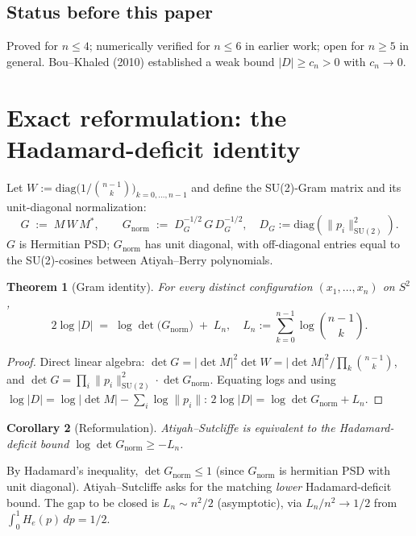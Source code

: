\documentclass[11pt,a4paper]{article}
\newtheorem{theorem}{Theorem}[section]
\newtheorem{corollary}[theorem]{Corollary}
\begin{document}
\subsection{Status before this paper}
Proved for $n \le 4$; numerically verified for $n \le 6$ in earlier work; open
for $n \ge 5$ in general. Bou--Khaled (2010) established a weak bound
$|D| \ge c_n > 0$ with $c_n \to 0$.

\section{Exact reformulation: the Hadamard-deficit identity}\label{sec:reformulation}

Let $W := \mathrm{diag}\bigl(1/\binom{n-1}{k}\bigr)_{k=0,\ldots,n-1}$ and define the
SU(2)-Gram matrix and its unit-diagonal normalization:
\[
G \;:=\; M\, W\, M^*, \qquad
G_{\mathrm{norm}} \;:=\; D_{\!G}^{-1/2}\, G\, D_{\!G}^{-1/2},
\quad D_{\!G} := \mathrm{diag}(\|p_i\|_{\mathrm{SU}(2)}^2).
\]
$G$ is Hermitian PSD; $G_{\mathrm{norm}}$ has unit diagonal, with off-diagonal
entries equal to the SU(2)-cosines between Atiyah--Berry polynomials.

\begin{theorem}[Gram identity]\label{thm:identity}
For every distinct configuration $(x_1, \ldots, x_n)$ on $S^2$,
\[
\boxed{
2 \log |D| \;=\; \log \det\bigl(G_{\mathrm{norm}}\bigr) \;+\; L_n,
\quad L_n := \sum_{k=0}^{n-1} \log \binom{n-1}{k}.
}
\]
\end{theorem}

\begin{proof}
Direct linear algebra: $\det G = |\det M|^2 \det W = |\det M|^2 / \prod_k \binom{n-1}{k}$,
and $\det G = \prod_i \|p_i\|_{\mathrm{SU}(2)}^2 \cdot \det G_{\mathrm{norm}}$. Equating logs
and using $\log|D| = \log|\det M| - \sum_i \log\|p_i\|$:
$2 \log|D| = \log\det G_{\mathrm{norm}} + L_n$.
\end{proof}

\begin{corollary}[Reformulation]\label{cor:reform}
Atiyah--Sutcliffe is equivalent to the Hadamard-deficit bound
$\log\det G_{\mathrm{norm}} \ge -L_n$.
\end{corollary}

By Hadamard's inequality, $\det G_{\mathrm{norm}} \le 1$ (since $G_{\mathrm{norm}}$
is hermitian PSD with unit diagonal). Atiyah--Sutcliffe asks for the matching
\emph{lower} Hadamard-deficit bound. The gap to be closed is $L_n \sim n^2/2$
(asymptotic), via $L_n / n^2 \to 1/2$ from $\int_0^1 H_e(p)\, dp = 1/2$.
\end{document}

